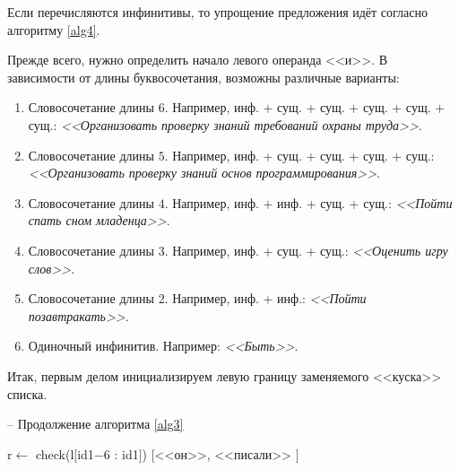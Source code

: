 \documentclass[main]{subfiles}
\begin{document}
Если перечисляются инфинитивы, то упрощение предложения идёт согласно алгоритму \ref{alg4}.

Прежде всего, нужно определить начало левого операнда <<и>>. В зависимости от длины буквосочетания, возможны различные варианты:
\begin{enumerate}
	\item Словосочетание длины $6$. Например, инф. + сущ. + сущ. + сущ. + сущ. + сущ.: \textit{<<Организовать проверку знаний требований охраны труда>>}.
	\item Словосочетание длины $5$. Например, инф. + сущ. + сущ. + сущ. + сущ.: \textit{<<Организовать проверку знаний основ программирования>>}.
	\item Словосочетание длины $4$. Например, инф. + инф. + сущ. + сущ.: \textit{<<Пойти спать сном младенца>>}.
	\item Словосочетание длины $3$. Например, инф. + сущ. + сущ.: \textit{<<Оценить игру слов>>}.
	\item Словосочетание длины $2$. Например, инф. + инф.: \textit{<<Пойти позавтракать>>}.
	\item Одиночный инфинитив. Например: \textit{<<Быть>>}.
\end{enumerate}
Итак, первым делом инициализируем левую границу заменяемого <<куска>> списка.
\begin{algorithm}
	\caption{-- Продолжение алгоритма \ref{alg3}}\label{alg4}
	\begin{algorithmic}[1]
		 
		\State r$\gets$ check(l$[$id1$-6$ : id1$]$)
		\State \Return $[$<<он>>, <<писали>> $]$ 
	\end{algorithmic}
\end{algorithm}
\end{document}
